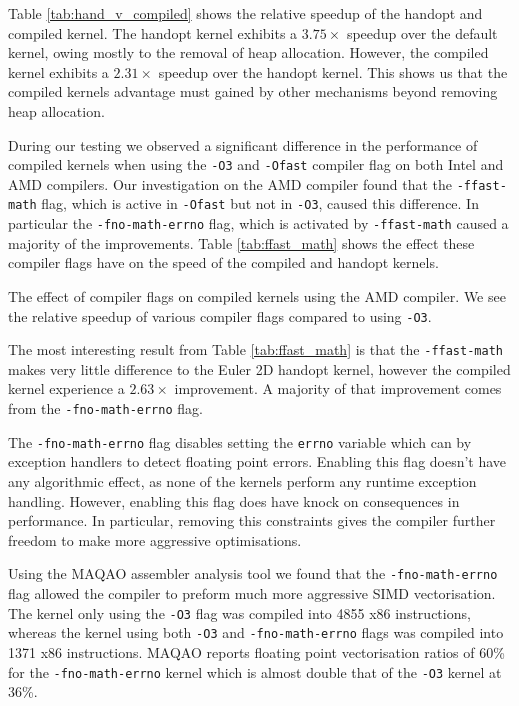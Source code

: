 Table \ref{tab:hand_v_compiled} shows the relative speedup of the handopt and compiled kernel.
The handopt kernel exhibits a $3.75\times$ speedup over the default kernel, owing mostly to the removal of heap allocation.
However, the compiled kernel exhibits a $2.31\times$ speedup over the handopt kernel.
This shows us that the compiled kernels advantage must gained by other mechanisms beyond removing heap allocation.

During our testing we observed a significant difference in the performance of compiled kernels when using the \texttt{-O3} and \texttt{-Ofast} compiler flag on both Intel and AMD compilers.
Our investigation on the AMD compiler found that the \texttt{-ffast-math} flag, which is active in \texttt{-Ofast} but not in \texttt{-O3}, caused this difference.
In particular the \texttt{-fno-math-errno} flag, which is activated by \texttt{-ffast-math} caused a majority of the improvements.
Table \ref{tab:ffast_math} shows the effect these compiler flags have on the speed of the compiled and handopt kernels.

\begin{table}
    \centering
 
\caption{The effect of compiler flags on compiled kernels using the AMD compiler. We see the relative speedup of various compiler flags compared to using \texttt{-O3}.}\label{tab:ffast_math} 
\end{table}

The most interesting result from Table \ref{tab:ffast_math} is that the \texttt{-ffast-math} makes very little difference to the Euler 2D handopt kernel, however the compiled kernel experience a $2.63\times$ improvement.
A majority of that improvement comes from the \texttt{-fno-math-errno} flag.

The \texttt{-fno-math-errno} flag disables setting the \texttt{errno} variable which can by exception handlers to detect floating point errors.
Enabling this flag doesn't have any algorithmic effect, as none of the kernels perform any runtime exception handling.
However, enabling this flag does have knock on consequences in performance.
In particular, removing this constraints gives the compiler further freedom to make more aggressive optimisations.

Using the MAQAO assembler analysis tool \cite{MAQAO} we found that the \texttt{-fno-math-errno} flag allowed the compiler to preform much more aggressive SIMD vectorisation.
The kernel only using the \texttt{-O3} flag was compiled into 4855 x86 instructions, whereas the kernel using both \texttt{-O3} and \texttt{-fno-math-errno} flags was compiled into 1371 x86 instructions.
MAQAO reports floating point vectorisation ratios of 60\% for the \texttt{-fno-math-errno} kernel which is almost double that of the \texttt{-O3} kernel at 36\%.

